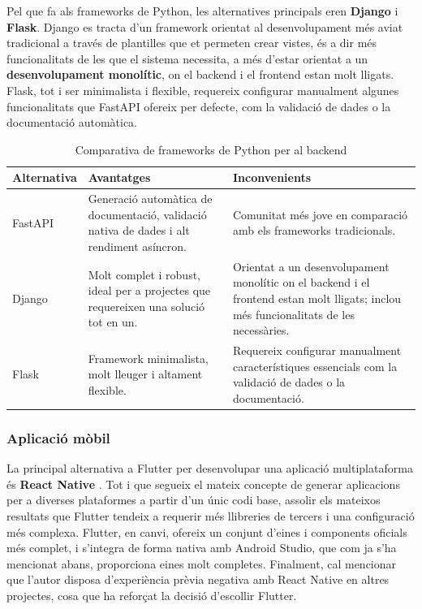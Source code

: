 \documentclass[11pt,a4paper]{report}
\begin{document}
Pel que fa als frameworks de Python, les alternatives principals eren \textbf{Django} i \textbf{Flask}. Django es tracta d'un framework orientat al desenvolupament més aviat tradicional a través de plantilles que et permeten crear vistes, és a dir més funcionalitats de les que el sistema necessita, a més d'estar orientat a un \textbf{desenvolupament monolític}, on el backend i el frontend estan molt lligats. Flask, tot i ser minimalista i flexible, requereix configurar manualment algunes funcionalitats que FastAPI ofereix per defecte, com la validació de dades o la documentació automàtica.

\begin{table}[H]
\centering
\begin{tabular}{|l|p{5cm}|p{5cm}|}
\hline
\textbf{Alternativa} & \textbf{Avantatges} & \textbf{Inconvenients} \\
\hline
FastAPI & Generació automàtica de documentació, validació nativa de dades i alt rendiment asíncron. & Comunitat més jove en comparació amb els frameworks tradicionals. \\
\hline
Django & Molt complet i robust, ideal per a projectes que requereixen una solució tot en un. & Orientat a un desenvolupament monolític on el backend i el frontend estan molt lligats; inclou més funcionalitats de les necessàries. \\
\hline
Flask & Framework minimalista, molt lleuger i altament flexible. & Requereix configurar manualment característiques essencials com la validació de dades o la documentació. \\
\hline
\end{tabular}
\caption{Comparativa de frameworks de Python per al backend}
\label{tab:backend_frameworks}
\end{table}

\subsubsection{Aplicació mòbil}
La principal alternativa a Flutter per desenvolupar una aplicació multiplataforma és \textbf{React Native} \cite{noauthor_react_nodate}. Tot i que segueix el mateix concepte de generar aplicacions per a diverses plataformes a partir d'un únic codi base, assolir els mateixos resultats que Flutter tendeix a requerir més llibreries de tercers i una configuració més complexa. Flutter, en canvi, ofereix un conjunt d'eines i components oficials més complet, i s'integra de forma nativa amb Android Studio, que com ja s'ha mencionat abans, proporciona eines molt completes.
Finalment, cal mencionar que l'autor disposa d'experiència prèvia negativa amb React Native en altres projectes, cosa que ha reforçat la decisió d'escollir Flutter.
\end{document}
